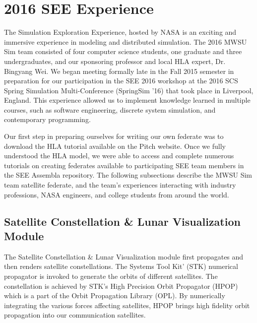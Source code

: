 \documentclass[journal, onecolumn]{IEEEtran}
\begin{document}
\section{2016 SEE Experience}
The Simulation Exploration Experience, hosted by NASA is an exciting and immersive experience in modeling and distributed simulation.  The 2016 MWSU Sim team consisted of four computer science students, one graduate and three undergraduates, and our sponsoring professor and local HLA expert, Dr. Bingyang Wei.  We began meeting formally late in the Fall 2015 semester in preparation for our participation in the SEE 2016 workshop at the 2016 SCS Spring Simulation Multi-Conference (SpringSim '16) that took place in Liverpool, England.  This experience allowed us to implement knowledge learned in multiple courses, such as software engineering, discrete system simulation, and contemporary programming.

Our first step in preparing ourselves for writing our own federate was to download the HLA tutorial available on the Pitch website\cite{HLA}.  Once we fully understood the HLA model, we were able to access and complete numerous tutorials on creating federates available to participating SEE team members in the SEE Assembla repository. The following subsections describe the MWSU Sim team satellite federate, and the team\rq{}s experiences interacting with industry professions, NASA engineers, and college students from around the world.

\subsection{Satellite Constellation \& Lunar Visualization Module}
The Satellite Constellation \& Lunar Visualization module first propagates and then renders satellite constellations. The Systems Tool Kit\rq{} (STK) numerical propagator is invoked to generate the orbits of different satellites. The constellation is achieved by STK\rq{}s High Precision Orbit Propagator (HPOP) which is a part of the Orbit Propagation Library (OPL). By numerically integrating the various forces affecting satellites, HPOP brings high fidelity orbit propagation into our communication satellites.
\end{document}
